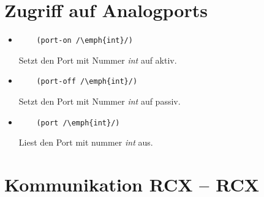 \documentclass[12pt,a4paper]{article}
\begin{document}
\section{Zugriff auf Analogports}

\begin{itemize}
\item
  \begin{lstlisting}
    (port-on /\emph{int}/)
  \end{lstlisting}
  Setzt den Port mit Nummer \emph{int} auf aktiv.
\item
  \begin{lstlisting}
    (port-off /\emph{int}/)
  \end{lstlisting}
  Setzt den Port mit Nummer \emph{int} auf passiv.
\item
  \begin{lstlisting}
    (port /\emph{int}/)
  \end{lstlisting}
  Liest den Port mit nummer \emph{int} aus.
\end{itemize}

\section{Kommunikation RCX -- RCX}
\end{document}
